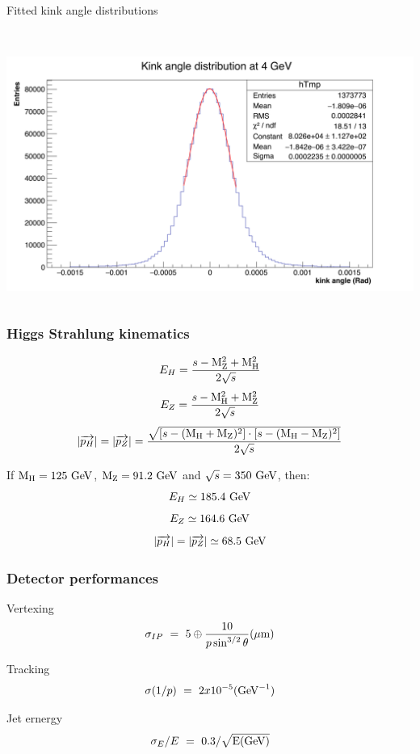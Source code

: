 \documentclass{beamer}
\begin{document}
\begin{frame}
\begin{block}{Fitted kink angle distributions}
\begin{columns}[c]
\begin{column}{5cm}
          \ 
          \includegraphics[width = \textwidth]{Pictures/kinkAngle4GeV.png}
        \end{column} 
      \end{columns}
    \end{block}
  \end{frame}




  \begin{frame}[plain]
    \frametitle{Higgs Strahlung kinematics}

    \[ E_H = \frac{s - \rm{M}_Z^2 + \rm{M}_H^2}{2\sqrt{s}} \]
    \[ E_Z = \frac{s - \rm{M}_H^2 + \rm{M}_Z^2}{2\sqrt{s}} \]
    \[ | \overrightarrow{p_H} | = | \overrightarrow{p_Z} | = \frac{\sqrt{\left[ s - (\rm{M}_H + \rm{M}_Z)^2 \right] \cdot \left[s - (\rm{M}_H - \rm{M}_Z)^2 \right]}}{2\sqrt{s}} \]

    If $\rm{M}_H = 125~\rm{GeV}$, $\rm{M}_Z = 91.2~\rm{GeV}$ and $\sqrt{s} = 350~\rm{GeV}$, then:
    \[ E_H \simeq 185.4~\rm{GeV} \]
    \[ E_Z \simeq 164.6~\rm{GeV} \]
    \[  | \overrightarrow{p_H} | = | \overrightarrow{p_Z} | \simeq 68.5~\rm{GeV}\]

  \end{frame}

  \begin{frame}[plain]
    \frametitle{Detector performances}

    \begin{block}{Vertexing}
      \[ \sigma_{IP} \ = \ 5 \oplus \frac{10}{p\sin^{3/2}\theta} (\mu\rm{m})\]
    \end{block}

    \begin{block}{Tracking}
      \[ \sigma (1/p) \ = \ 2x10^{-5} (\rm{GeV}^{-1})\]
    \end{block}
      
    \begin{block}{Jet ernergy}
      \[\sigma_E / E \ = \ 0.3/\sqrt{\rm{E(GeV)}}\]
    \end{block}

  \end{frame}
\end{document}
